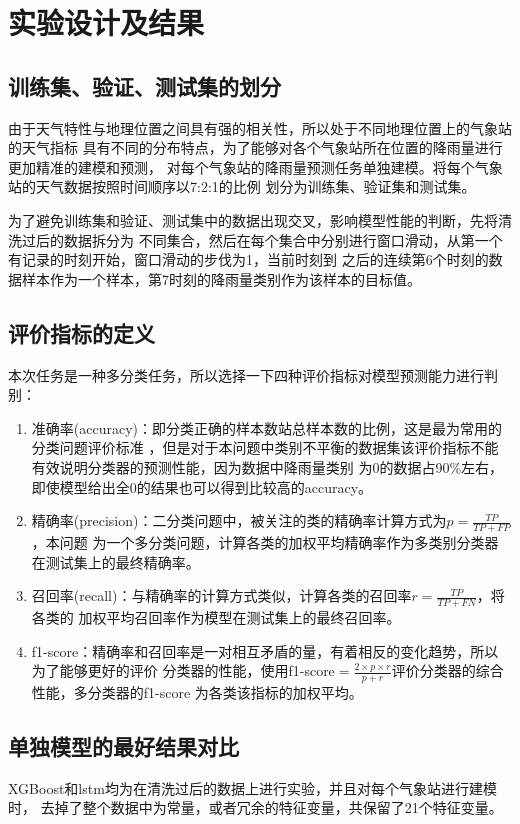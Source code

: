 \documentclass[UTF8]{ctexart}
\begin{document}
\section{实验设计及结果}

\subsection{训练集、验证、测试集的划分}
由于天气特性与地理位置之间具有强的相关性，所以处于不同地理位置上的气象站的天气指标
具有不同的分布特点，为了能够对各个气象站所在位置的降雨量进行更加精准的建模和预测，
对每个气象站的降雨量预测任务单独建模。将每个气象站的天气数据按照时间顺序以7:2:1的比例
划分为训练集、验证集和测试集。

为了避免训练集和验证、测试集中的数据出现交叉，影响模型性能的判断，先将清洗过后的数据拆分为
不同集合，然后在每个集合中分别进行窗口滑动，从第一个有记录的时刻开始，窗口滑动的步伐为1，当前时刻到
之后的连续第6个时刻的数据样本作为一个样本，第7时刻的降雨量类别作为该样本的目标值。

\subsection{评价指标的定义}
本次任务是一种多分类任务，所以选择一下四种评价指标对模型预测能力进行判别：
\begin{enumerate}
    \item 准确率(accuracy)：即分类正确的样本数站总样本数的比例，这是最为常用的分类问题评价标准
    ，但是对于本问题中类别不平衡的数据集该评价指标不能有效说明分类器的预测性能，因为数据中降雨量类别
    为0的数据占90\%左右，即使模型给出全0的结果也可以得到比较高的accuracy。
    \item 精确率(precision)：二分类问题中，被关注的类的精确率计算方式为$p=\frac{TP}{TP+FP}$，本问题
    为一个多分类问题，计算各类的加权平均精确率作为多类别分类器在测试集上的最终精确率。
    \item 召回率(recall)：与精确率的计算方式类似，计算各类的召回率$r=\frac{TP}{TP+FN}$，将各类的
    加权平均召回率作为模型在测试集上的最终召回率。
    \item f1-score：精确率和召回率是一对相互矛盾的量，有着相反的变化趋势，所以为了能够更好的评价
    分类器的性能，使用f1-score$= \frac{2\times p\times r}{p+r}$评价分类器的综合性能，多分类器的f1-score
    为各类该指标的加权平均。
\end{enumerate}

\subsection{单独模型的最好结果对比}
XGBoost和lstm均为在清洗过后的数据上进行实验，并且对每个气象站进行建模时，
去掉了整个数据中为常量，或者冗余的特征变量，共保留了21个特征变量。
\end{document}
